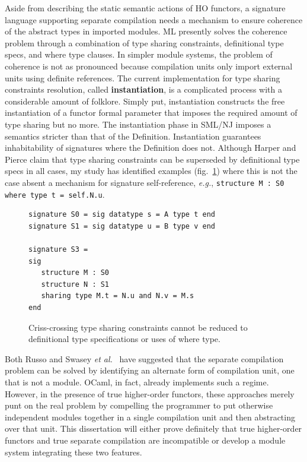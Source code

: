 \documentclass[12pt]{article}
\newcommand{\etal}{{\it et al.}}
\begin{document}
		
		Aside from describing the static semantic actions of HO functors, a signature language supporting separate compilation needs a mechanism to ensure coherence of the abstract types in imported modules. ML presently solves the coherence problem through a combination of type sharing constraints, definitional type specs, and where type clauses. In simpler module systems, the problem of coherence is not as pronounced because compilation units only import external units using definite references\cite{swasey06}. The current implementation for type sharing constraints resolution, called {\bf instantiation}, is a complicated process with a considerable amount of folklore. Simply put, instantiation constructs the free instantiation of a functor formal parameter that imposes the required amount of type sharing but no more. The instantiation phase in SML/NJ imposes a semantics stricter than that of the Definition. Instantiation guarantees inhabitability of signatures where the Definition does not. Although Harper and Pierce \cite{ATTAPL} claim that type sharing constraints can be superseded by definitional type specs in all cases, my study has identified examples (fig.~\ref{fig:crisscross}) where this is not the case absent a mechanism for signature self-reference, {\it e.g.}, \lstinline{structure M : S0 where type t = self.N.u}.

\begin{figure}		
\begin{lstlisting}
signature S0 = sig datatype s = A type t end
signature S1 = sig datatype u = B type v end

signature S3 =
sig
   structure M : S0 
   structure N : S1
   sharing type M.t = N.u and N.v = M.s
end 
\end{lstlisting}
\caption{Criss-crossing type sharing constraints cannot be reduced to definitional type specifications or uses of where type.}
\label{fig:crisscross}
\end{figure}

		Both Russo \cite{russothesis} and Swasey \etal~\cite{swasey06} have suggested that the separate compilation problem can be solved by identifying an alternate form of compilation unit, one that is not a module. OCaml, in fact, already implements such a regime. However, in the presence of true higher-order functors, these approaches merely punt on the real problem by compelling the programmer to put otherwise independent modules together in a single compilation unit and then abstracting over that unit. This dissertation will either prove definitely that true higher-order functors and true separate compilation are incompatible or develop a module system integrating these two features. 
		
\end{document}
